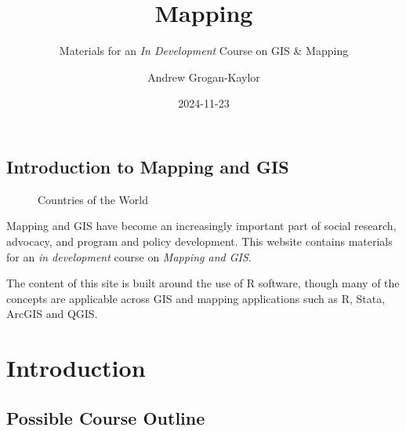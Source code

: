 \documentclass[
  letterpaper,
  DIV=11,
  numbers=noendperiod,
  oneside]{scrreprt}
\title{Mapping}
\subtitle{Materials for an \emph{In Development} Course on GIS \&
Mapping}
\author{Andrew Grogan-Kaylor}
\date{2024-11-23}
\renewcommand*\contentsname{Table of contents}
\newcommand\contentsname{Table of contents}
\begin{document}
\maketitle

\renewcommand*\contentsname{Table of contents}
{
\hypersetup{linkcolor=}
\setcounter{tocdepth}{2}
\tableofcontents
}
\listoffigures
\listoftables

\chapter{Introduction to Mapping and
GIS}\label{introduction-to-mapping-and-gis}

\begin{figure}


\caption{\label{fig-world}Countries of the World}

\end{figure}%

Mapping and GIS have become an increasingly important part of social
research, advocacy, and program and policy development. This website
contains materials for an \emph{in development} course on \emph{Mapping
and GIS}.

The content of this site is built around the use of R software, though
many of the concepts are applicable across GIS and mapping applications
such as R, Stata, ArcGIS and QGIS.

\part{Introduction}

\chapter{Possible Course Outline}\label{possible-course-outline}
\end{document}
